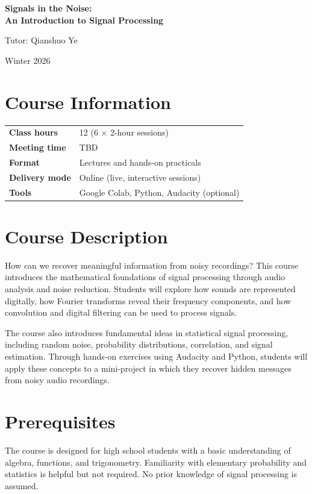 \documentclass[12pt,fontset=none]{ctexart}
\newcommand{\coursetitle}[3]{%
  \begin{center}
    {\LARGE #1\par}
    \vspace{1.4em}
    {\large #2\par}
    \vspace{0.3em}
    {\large #3\par}
  \end{center}
}
\begin{document}

\renewcommand{\theHsection}{en.\arabic{section}}

\coursetitle
  {\textbf{Signals in the Noise: \\
  An Introduction to Signal Processing}}
  {Tutor: Qianshuo Ye}
  {Winter 2026}

\thispagestyle{plain}

\section{Course Information}

\begin{tabular}{@{}>{\bfseries}l l@{}}
Class hours & 12 (6 $\times$ 2-hour sessions) \\
Meeting time & TBD \\
Format & Lectures and hands-on practicals \\
Delivery mode & Online (live, interactive sessions) \\
Tools & Google Colab, Python, Audacity (optional)
\end{tabular}

\section{Course Description}

How can we recover meaningful information from noisy
recordings? This course introduces the mathematical
foundations of signal processing through audio analysis
and noise reduction. Students will explore how sounds
are represented digitally, how Fourier transforms reveal
their frequency components, and how convolution and
digital filtering can be used to process signals.

The course also introduces fundamental ideas in
statistical signal processing, including random noise,
probability distributions, correlation, and signal
estimation. Through hands-on exercises using Audacity
and Python, students will apply these concepts to a
mini-project in which they recover hidden messages
from noisy audio recordings.

\section{Prerequisites}

The course is designed for high school students
with a basic understanding of algebra, functions,
and trigonometry. Familiarity with elementary
probability and statistics is helpful but not required.
No prior knowledge of signal processing is assumed.
\end{document}
